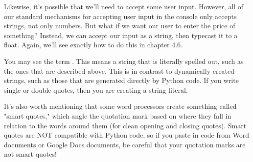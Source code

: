 Likewise, it's possible that we'll need to accept some user input. However, all of our standard mechanisms for accepting user input in the console only accepts strings, not only numbers. But what if we want our user to enter the price of something? Instead, we can accept our input as a string, then typecast it to a float. Again, we'll see exactly how to do this in chapter 4.6.\par
You may see the term . This means a string that is literally spelled out, such as the ones that are described above. This is in contrast to dynamically created strings, such as those that are generated directly by Python code. If you write single or double quotes, then you are creating a string literal.\par
It's also worth mentioning that some word processors create something called "smart quotes," which angle the quotation mark based on where they fall in relation to the words around them (for clean opening and closing quotes). Smart quotes are NOT compatible with Python code, so if you paste in code from Word documents or Google Docs documents, be careful that your quotation marks are not smart quotes!\par
{}
